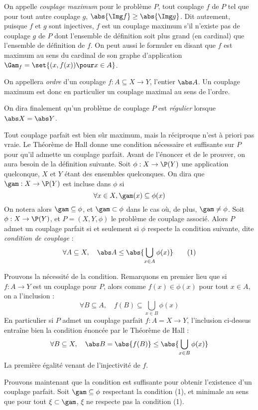 On appelle \emph{couplage maximum} pour le problème $P$, tout couplage $f$ de $P$ tel que pour tout autre couplage $g$, $\abs{\Img f} \geq \abs{\Img g}$. Dit autrement, puisque $f$ et $g$ sont injectives, $f$ est un couplage maximum s'il n'existe pas de couplage $g$ de $P$ dont l'ensemble de définition soit plus grand (en cardinal) que l'ensemble de définition de $f$. On peut aussi le formuler en disant que $f$ est maximum au sens du cardinal de son graphe d'application $\Gam_f = \set{(x,f(x)) \pour x \in A}$.

On appellera \emph{ordre} d'un couplage $f : A \subseteq X \to Y$, l'entier $\abs A$. Un couplage maximum est donc en particulier un couplage maximal au sens de l'ordre.

On dira finalement qu'un problème de couplage $P$ est \emph{régulier} lorsque $\abs X = \abs Y$.
\SEP

Tout couplage parfait est bien sûr maximum, mais la réciproque n'est à priori pas vraie. Le Théorème de Hall donne une condition nécessaire et suffisante sur $P$ pour qu'il admette un couplage parfait. Avant de l'énoncer et de le prouver, on aura besoin de la définition suivante.
\SEP\jdefi Soit $\phi : X \to \P (Y)$ une application quelconque, $X$ et $Y$ étant des ensembles quelconques. On dira que $\gam : X \to \P (Y)$ est incluse dans $\phi$ si
\[ \forall x \in X, \gam(x) \subseteq \phi(x) \]
On notera alors $\gam \subseteq \phi$, et $\gam \subset \phi$ dans le cas où, de plus, $\gam \neq \phi$.
\SEP{} Soit $\phi : X \to \P(Y)$, et $P = (X,Y,\phi)$ le problème de couplage associé. Alors $P$ admet un couplage parfait si et seulement si $\phi$ respecte la condition suivante, dite \emph{condition de couplage} :
\[ \forall A \subseteq X, \quad \abs A \leq \abs{ \bigcup _{x \in A} \phi(x) } \tag{1} \]
\SEP\jpreuve

    Prouvons la nécessité de la condition. Remarquons en premier lieu que si $f : A \to Y $ est un couplage pour $P$, alors comme $f(x) \in \phi(x)$ pour tout $x \in A$, on a l'inclusion :
    \[ \forall B \subseteq A, \quad f(B) \subseteq \bigcup _{x \in B} \phi(x) \]
    En particulier si $P$ admet un couplage parfait $f : A = X \to Y$, l'inclusion ci-dessus entraîne bien la condition énoncée par le Théorème de Hall :
    \[ \forall B \subseteq X, \quad \abs B = \abs{f(B)} \leq \abs{ \bigcup _{x \in B} \phi(x) } \]
    La première égalité venant de l'injectivité de $f$.
    \medskip
    
    Prouvons maintenant que la condition est suffisante pour obtenir l'existence d'un couplage parfait. Soit $\gam \subseteq \phi$ respectant la condition (1), et minimale au sens que pour tout $\xi \subset \gam$, $\xi$ ne respecte pas la condition (1).
    
